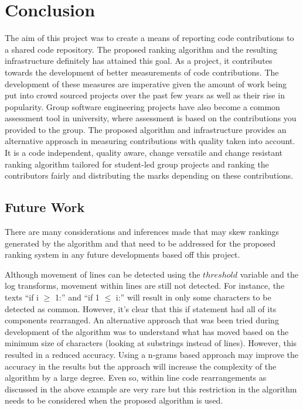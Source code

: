 \chapter{Conclusion}

The aim of this project was to create a means of reporting code contributions to a shared code repository. The proposed ranking algorithm and the resulting infrastructure definitely has attained this goal. As a project, it contributes towards the development of better measurements of code contributions. The development of these measures are imperative given the amount of work being put into crowd sourced projects over the past few years as well as their rise in popularity. Group software engineering projects have also become a common assessment tool in university, where assessment is based on the contributions you provided to the group. The proposed algorithm and infrastructure provides an alternative approach in measuring contributions with quality taken into account. It is a code independent, quality aware, change versatile and change resistant ranking algorithm tailored for student-led group projects and ranking the contributors fairly and distributing the marks depending on these contributions. 

\section{Future Work}
There are many considerations and inferences made that may skew rankings generated by the algorithm and that need to be addressed for the proposed ranking system in any future developments based off this project. 

Although movement of lines can be detected using the $threshold$ variable and the log transforms, movement within lines are still not detected. For instance, the texts “if i $\geq$ 1:” and “if 1 $\leq$ i:” will result in only some characters to be detected as common. However, it's clear that this if statement had all of its components rearranged. An alternative approach that was been tried during development of the algorithm was to understand what has moved based on the minimum size of characters (looking at substrings instead of lines). However, this resulted in a reduced accuracy. Using a n-grams based approach \citep{wiki:ngram} may improve the accuracy in the results but the approach will increase the complexity of the algorithm by a large degree. Even so, within line code rearrangements as discussed in the above example are very rare but this restriction in the algorithm needs to be considered when the proposed algorithm is used.

